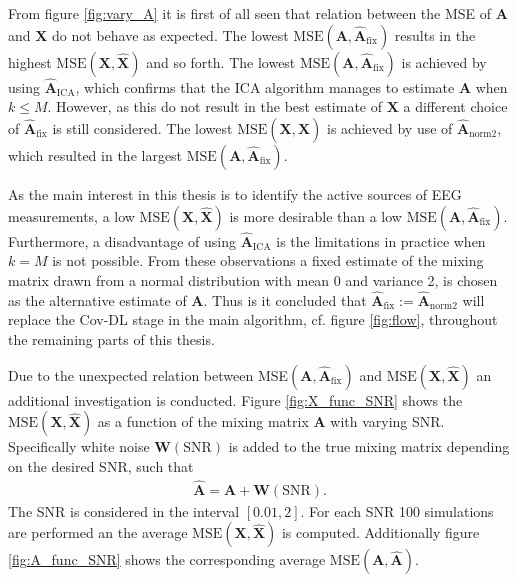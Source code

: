 From figure \ref{fig:vary_A} it is first of all seen that relation between the MSE of $\mathbf{A}$ and $\mathbf{X}$ do not behave as expected. The lowest $\text{MSE}(\mathbf{A}, \hat{\mathbf{A}}_{\text{fix}})$ results in the highest $\text{MSE}(\mathbf{X}, \hat{\mathbf{X}})$ and so forth. 
The lowest $\text{MSE}(\mathbf{A}, \hat{\mathbf{A}}_{\text{fix}})$ is achieved by using $\hat{\mathbf{A}}_{\text{ICA}}$, which confirms that the ICA algorithm manages to estimate $\mathbf{A}$ when $k \leq M$. 
However, as this do not result in the best estimate of $\mathbf{X}$ a different choice of $\hat{\mathbf{A}}_{\text{fix}}$ is still considered. 
The lowest $\text{MSE}(\mathbf{X}, \hat{\mathbf{X}})$ is achieved by use of $\hat{\mathbf{A}}_{\text{norm2}}$, which resulted in the largest $\text{MSE}(\mathbf{A}, \hat{\mathbf{A}}_{\text{fix}})$. 
      
As the main interest in this thesis is to identify the active sources of EEG measurements, a low $\text{MSE}(\mathbf{X}, \hat{\mathbf{X}})$ is more desirable than a low $\text{MSE}(\mathbf{A}, \hat{\mathbf{A}}_{\text{fix}})$. 
Furthermore, a disadvantage of using $\hat{\mathbf{A}}_{\text{ICA}}$ is the limitations in practice when $k = M$ is not possible. 
From these observations a fixed estimate of the mixing matrix drawn from a normal distribution with mean 0 and variance 2, is chosen as the alternative estimate of $\mathbf{A}$. 
Thus is it concluded that $\hat{\mathbf{A}}_{\text{fix}} := \hat{\mathbf{A}}_{\text{norm2}}$ will replace the Cov-DL stage in the main algorithm, cf. figure \ref{fig:flow}, throughout the remaining parts of this thesis. 

Due to the unexpected relation between MSE$(\mathbf{A}, \hat{\mathbf{A}}_{\text{fix}})$ and $\text{MSE}(\mathbf{X}, \hat{\mathbf{X}})$ an additional investigation is conducted. 
Figure \ref{fig:X_func_SNR} shows the $\text{MSE}(\mathbf{X}, \hat{\mathbf{X}})$ as a function of the mixing matrix $\mathbf{A}$ with varying SNR. 
Specifically white noise $\textbf{W}(\text{SNR})$ is added to the true mixing matrix depending on the desired SNR, such that 
\begin{align*}
\hat{\textbf{A}} = \textbf{A}+\textbf{W}(\text{SNR}).
\end{align*}
The SNR is considered in the interval $[0.01, 2]$. 
For each SNR 100 simulations are performed an the average $\text{MSE}(\mathbf{X}, \hat{\mathbf{X}})$ is computed.
Additionally figure \ref{fig:A_func_SNR} shows the corresponding average $\text{MSE}(\mathbf{A}, \hat{\mathbf{A}})$.

